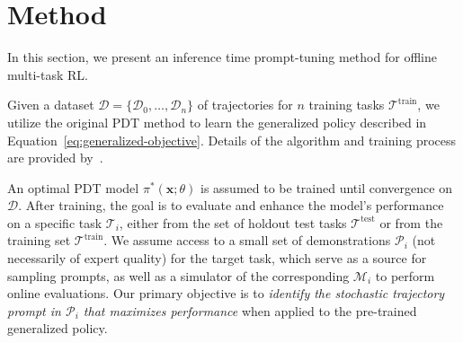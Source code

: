 \documentclass{article} %
\begin{document}
\section{Method}
\label{sec:method}
In this section, we present an inference time prompt-tuning method for offline multi-task RL.

Given a dataset $\mathcal{D} = \{ \mathcal{D}_0, \dots, \mathcal{D}_n \}$ of trajectories for $n$ training tasks $\mathcal{T}^\text{train}$, we utilize the original PDT method to learn the generalized policy described in Equation~\ref{eq:generalized-objective}. Details of the algorithm and training process are provided by~\citet{xu2022prompting}.

An optimal PDT model $\pi^*(\mathbf{x}; \theta)$ is assumed to be trained until convergence on $\mathcal{D}$. After training, the goal is to evaluate and enhance the model's performance on a specific task $\mathcal{T}_i$, either from the set of holdout test tasks $\mathcal{T}^\text{test}$ or from the training set $\mathcal{T}^\text{train}$. We assume access to a small set of demonstrations $\mathcal{P}_i$ (not necessarily of expert quality) for the target task, which serve as a source for sampling prompts, as well as a simulator of the corresponding $\mathcal{M}_i$ to perform online evaluations. 
Our primary objective is to \textit{identify the stochastic trajectory prompt in $\mathcal{P}_i$ that maximizes performance} when applied to the pre-trained generalized policy. %
\end{document}
